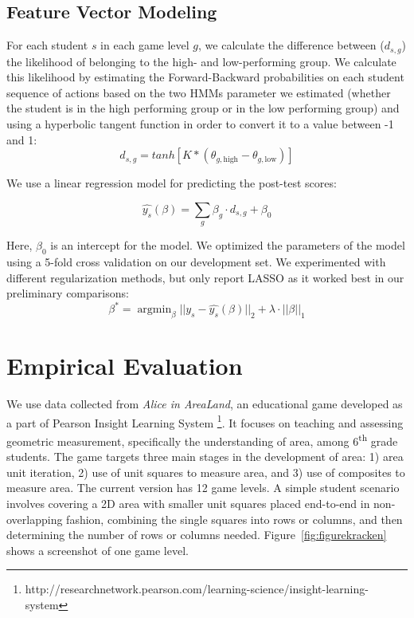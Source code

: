 \documentclass{sigchi}
\DeclareMathOperator*{\argmin}{argmin}
\begin{document}
	\subsection{Feature Vector Modeling}
	
	For each student $s$ in each game level $g$, we calculate the difference between ($d_{s,g}$) the likelihood of belonging to the high- and low-performing group.
	We calculate this likelihood by estimating the Forward-Backward probabilities  on each student sequence of actions  based on the two HMMs parameter we estimated (whether the student is in the high performing group or in the low performing group) and using a hyperbolic tangent function in order to convert it to a value between -1 and 1: 
	\begin{equation}
		d_{s,g} = tanh[ K * (\theta_{g, \text{high}} - \theta_{g, \text{low}})]
	\end{equation}
	
	We use  a linear regression model for predicting the post-test scores:
	
	\begin{equation}
		\hat {y_s}(\beta) =   \sum_g \beta_g \cdot d_{s,g}  + \beta_0
	\end{equation}
	
	Here, $\beta_0$ is an intercept for the  model.  
	We optimized the parameters of the model using a 5-fold cross validation on our development set.
	We experimented with different regularization methods, but only report LASSO \cite{tibshirani1996regression} as it worked best in our preliminary comparisons:
	\begin{equation}
		\beta^* = \argmin_\beta || y_s - \hat{y_s}(\beta)  ||_2 + \lambda \cdot || \beta ||_1
	\end{equation}
	
	
	\section{Empirical Evaluation}
	\label{sec:experiments}
	
	
	We use data collected from \textit {Alice in AreaLand},  an educational game developed as a part of Pearson Insight Learning System \footnote{http://researchnetwork.pearson.com/learning-science/insight-learning-system}. 
	It focuses on teaching and assessing geometric measurement, specifically the understanding of area, among 6\textsuperscript{th} grade students. 
	The game targets three main stages in the development of area: 1) area unit iteration, 2) use of unit squares to measure area, and 3) use of composites to measure area. 
	The current version has 12 game levels. 
	A simple student scenario involves covering a 2D area with smaller unit squares placed end-to-end in non-overlapping fashion, combining the single squares into rows or columns, and then determining the number of rows or columns needed. 
	Figure~\ref{fig:figurekracken} shows a screenshot of one game level.
	
\end{document}
